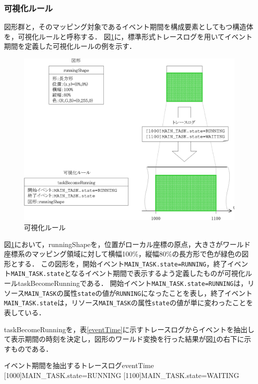 \subsubsection{可視化ルール}
図形群と，そのマッピング対象であるイベント期間を構成要素としてもつ構造体を，可視化ルールと呼称する．
図\ref{fig:timeShape}に，標準形式トレースログを用いてイベント期間を定義した可視化ルールの例を示す．
\begin{figure}[tb]
\begin{center}
\includegraphics[scale=0.9]{img/timeShape.eps}
\caption{可視化ルール}
\label{fig:timeShape}
\end{center}
\end{figure}
図\ref{fig:timeShape}において，runningShapeを，位置がローカル座標の原点，大きさがワールド座標系のマッピング領域に対して横幅100\%，縦幅80\%の長方形で色が緑色の図形とする．
この図形を，開始イベント\verb|MAIN_TASK.state=RUNNING|，終了イベント\verb|MAIN_TASK.state|となるイベント期間で表示するよう定義したものが可視化ルールtaskBecomeRunningである．
開始イベント\verb|MAIN_TASK.state=RUNNING|は，リソース\verb|MAIN_TASK|の属性\verb|state|の値が\verb|RUNNING|になったことを表し，終了イベント\verb|MAIN_TASK.state|は，リソース\verb|MAIN_TASK|の属性\verb|state|の値が単に変わったことを表している．

taskBecomeRunningを，表\ref{eventTime}に示すトレースログからイベントを抽出して表示期間の時刻を決定し，図形のワールド変換を行った結果が図\ref{fig:timeShape}の右下に示すものである．

\begin{File}{イベント期間を抽出するトレースログ}{eventTime}
[1000]MAIN_TASK.state=RUNNING
[1100]MAIN_TASK.state=WAITING
\end{File}

